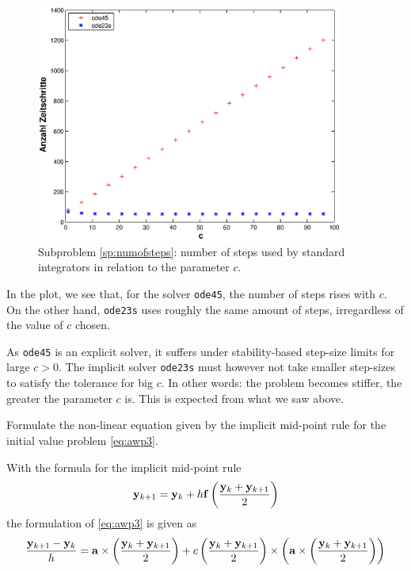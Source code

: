 \begin{problem}
\begin{subproblem}[2]
    \begin{figure}[!htb]
      \centering
      \includegraphics[width=0.9\textwidth]{../Problems/ch_ode/PICTURES/stiffrotpend.eps}
      \caption{Subproblem \ref{sp:numofsteps}: number of steps used by standard \matlab{} integrators in relation to the parameter $c$.}
        \label{fig:a3}
    \end{figure}
    
\begin{solution}
In the plot, we see that, for the solver \texttt{ode45}, the number of steps rises with $c$. On the other hand, \texttt{ode23s} uses roughly the same amount of steps, irregardless of the value of $c$ chosen.

As \texttt{ode45} is an explicit solver, it suffers under stability-based step-size limits for large $c>0$. The implicit solver \texttt{ode23s} must however not take smaller step-sizes to satisfy the tolerance for big $c$. In other words: the problem becomes stiffer, the greater the parameter $c$ is. This is expected from what we saw above.
\end{solution}
\end{subproblem}

\begin{subproblem}[2]\label{sp:4}
Formulate the non-linear equation given by the implicit mid-point rule
for the initial value problem \eqref{eq:awp3}.

\begin{solution}
With the formula for the implicit mid-point rule
    \begin{equation*}
      {\mathbf{y}}_{k+1} = {\mathbf{y}}_k + h{\mathbf{f}}\left(\frac{{\mathbf{y}}_{k} + {\mathbf{y}}_{k+1}}{2}\right)
    \end{equation*}
    the formulation of \eqref{eq:awp3} is given as
    \begin{equation*}
      \frac{ {\mathbf{y}}_{k+1} - {\mathbf{y}}_{k}}{h} = {\mathbf{a}}\times\left(\frac{{\mathbf{y}}_k+{\mathbf{y}}_{k+1}}{2}\right) +
      c\left(\frac{{\mathbf{y}}_k+{\mathbf{y}}_{k+1}}{2}\right)\times\left({\mathbf{a}}\times\left(\frac{{\mathbf{y}}_k+{\mathbf{y}}_{k+1}}{2}\right)\right)
    \end{equation*}
\end{solution}
\end{subproblem}


\end{problem}
